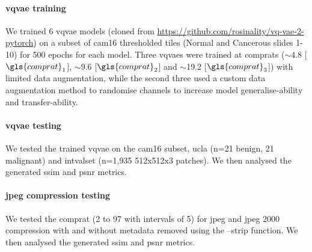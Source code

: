 \documentclass[review]{elsarticle}
\begin{document}


\paragraph{\gls{vqvae} training}
We trained 6 \gls{vqvae} models (cloned from \url{https://github.com/rosinality/vq-vae-2-pytorch}) on a subset of \gls{cam16} thresholded tiles (Normal and Cancerous slides 1-10) for 500 epochs for each model. Three \glspl{vqvae} were trained at \glspl{comprat} ($\sim$4.8 [$\gls{comprat}_{1}$], $\sim$9.6 [$\gls{comprat}_{2}$] and $\sim$19.2 [$\gls{comprat}_{3}$]) with limited data augmentation, while the second three used a custom data augmentation method to randomise channels to increase model generalise-ability and transfer-ability.

\paragraph{\gls{vqvae} testing}
We tested the trained \gls{vqvae} on the \gls{cam16} subset, \gls{ucla} (n=21 benign, 21 malignant) and \gls{intvalset} (n=1,935 512x512x3 patches). We then analysed the generated \gls{ssim} and \gls{psnr} metrics.

\paragraph{\gls{jpeg} compression testing}
We tested the \gls{comprat} (2 to 97 with intervals of 5) for \gls{jpeg} and \gls{jpeg} 2000 compression with and without metadata removed using the --strip function. We then analysed the generated \gls{ssim} and \gls{psnr} metrics.
\end{document}
